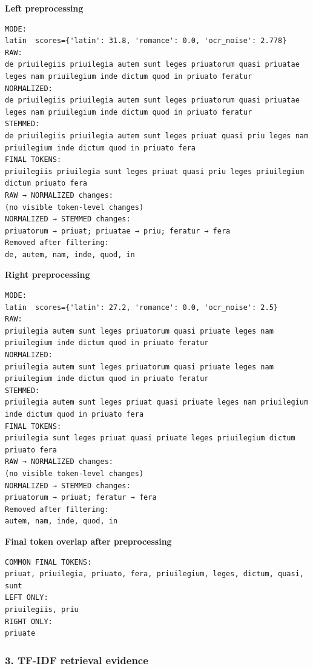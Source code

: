 \textbf{Left preprocessing} 

\begin{lstlisting}[breaklines=true,basicstyle=\ttfamily\small]
MODE:
latin  scores={'latin': 31.8, 'romance': 0.0, 'ocr_noise': 2.778}
RAW:
de priuilegiis priuilegia autem sunt leges priuatorum quasi priuatae leges nam priuilegium inde dictum quod in priuato feratur
NORMALIZED:
de priuilegiis priuilegia autem sunt leges priuatorum quasi priuatae leges nam priuilegium inde dictum quod in priuato feratur
STEMMED:
de priuilegiis priuilegia autem sunt leges priuat quasi priu leges nam priuilegium inde dictum quod in priuato fera
FINAL TOKENS:
priuilegiis priuilegia sunt leges priuat quasi priu leges priuilegium dictum priuato fera
RAW → NORMALIZED changes:
(no visible token-level changes)
NORMALIZED → STEMMED changes:
priuatorum → priuat; priuatae → priu; feratur → fera
Removed after filtering:
de, autem, nam, inde, quod, in
\end{lstlisting}

\textbf{Right preprocessing} 

\begin{lstlisting}[breaklines=true,basicstyle=\ttfamily\small]
MODE:
latin  scores={'latin': 27.2, 'romance': 0.0, 'ocr_noise': 2.5}
RAW:
priuilegia autem sunt leges priuatorum quasi priuate leges nam priuilegium inde dictum quod in priuato feratur
NORMALIZED:
priuilegia autem sunt leges priuatorum quasi priuate leges nam priuilegium inde dictum quod in priuato feratur
STEMMED:
priuilegia autem sunt leges priuat quasi priuate leges nam priuilegium inde dictum quod in priuato fera
FINAL TOKENS:
priuilegia sunt leges priuat quasi priuate leges priuilegium dictum priuato fera
RAW → NORMALIZED changes:
(no visible token-level changes)
NORMALIZED → STEMMED changes:
priuatorum → priuat; feratur → fera
Removed after filtering:
autem, nam, inde, quod, in
\end{lstlisting}

\textbf{Final token overlap after preprocessing} 

\begin{lstlisting}[breaklines=true,basicstyle=\ttfamily\small]
COMMON FINAL TOKENS:
priuat, priuilegia, priuato, fera, priuilegium, leges, dictum, quasi, sunt
LEFT ONLY:
priuilegiis, priu
RIGHT ONLY:
priuate
\end{lstlisting}

\subsubsection{3. TF-IDF retrieval evidence}

